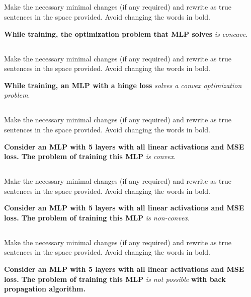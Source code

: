 \begin{frame}
\section{}
Make the necessary minimal changes  (if any required) and rewrite as true sentences in the space provided. Avoid changing the words in bold.

{\bf While training, the optimization problem that MLP solves} {\em is concave}.

\end{frame}

\begin{frame}
\section{}
Make the necessary minimal changes  (if any required) and rewrite as true sentences in the space provided. Avoid changing the words in bold.

{\bf While training, an MLP with a hinge loss} {\em solves a convex optimization problem}.

\end{frame}

\begin{frame}
\section{}
Make the necessary minimal changes  (if any required) and rewrite as true sentences in the space provided. Avoid changing the words in bold.

{\bf Consider an MLP with 5 layers with all linear activations and MSE loss.}
{\bf The problem of training this MLP } {\em is convex.}

\end{frame}

\begin{frame}
\section{}
Make the necessary minimal changes  (if any required) and rewrite as true sentences in the space provided. Avoid changing the words in bold.

{\bf Consider an MLP with 5 layers with all linear activations and MSE loss.}
{\bf The problem of training this MLP } {\em is non-convex.}

\end{frame}

\begin{frame}
\section{}
Make the necessary minimal changes  (if any required) and rewrite as true sentences in the space provided. Avoid changing the words in bold.

{\bf Consider an MLP with 5 layers with all linear activations and MSE loss.}
{\bf The problem of training this MLP } {\em is not possible} {\bf with back propagation algorithm.}
\end{frame}
